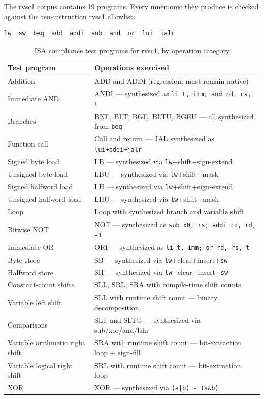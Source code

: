 The rvsc1 corpus contains 19 programs. Every mnemonic they produce is checked against the
ten-instruction rvsc1 allowlist:

\begin{lstlisting}
lw  sw  beq  add  addi  sub  and  or  lui  jalr
\end{lstlisting}

\begin{table}[htb]
\centering
\caption{ISA compliance test programs for rvsc1, by operation category}
\label{tab:sc1-isa-files}
\begin{tabular}{p{3.6cm}p{10.9cm}}
\toprule
\textbf{Test program} & \textbf{Operations exercised} \\
\midrule
Addition     & ADD and ADDI (regression: must remain native) \\
Immediate AND & ANDI --- synthesized as \texttt{li t, imm; and rd, rs, t} \\
Branches     & BNE, BLT, BGE, BLTU, BGEU --- all synthesized from \texttt{beq} \\
Function call & Call and return --- JAL synthesized as \texttt{lui+addi+jalr} \\
Signed byte load & LB --- synthesized via \texttt{lw}+shift+sign-extend \\
Unsigned byte load & LBU --- synthesized via \texttt{lw}+shift+mask \\
Signed halfword load & LH --- synthesized via \texttt{lw}+shift+sign-extend \\
Unsigned halfword load & LHU --- synthesized via \texttt{lw}+shift+mask \\
Loop         & Loop with synthesized branch and variable shift \\
Bitwise NOT  & NOT --- synthesized as \texttt{sub x0, rs; addi rd, rd, -1} \\
Immediate OR & ORI --- synthesized as \texttt{li t, imm; or rd, rs, t} \\
Byte store   & SB --- synthesized via \texttt{lw}+clear+insert+\texttt{sw} \\
Halfword store & SH --- synthesized via \texttt{lw}+clear+insert+\texttt{sw} \\
Constant-count shifts & SLL, SRL, SRA with compile-time shift counts \\
Variable left shift & SLL with runtime shift count --- binary decomposition \\
Comparisons  & SLT and SLTU --- synthesized via sub/xor/and/lshr \\
Variable arithmetic right shift & SRA with runtime shift count --- bit-extraction loop + sign-fill \\
Variable logical right shift & SRL with runtime shift count --- bit-extraction loop \\
XOR          & XOR --- synthesized via \texttt{(a|b) - (a\&b)} \\
\bottomrule
\end{tabular}
\end{table}

